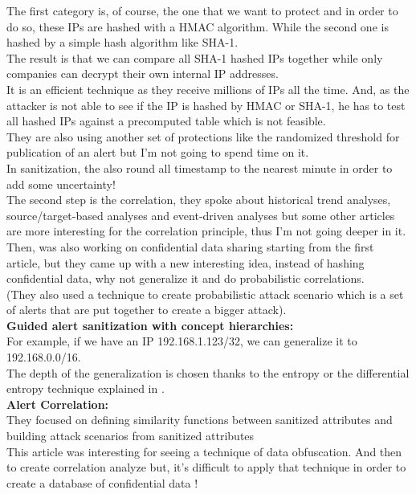 \documentclass[10pt]{article}
\begin{document}
The first category is, of course, the one that we want to protect and in order to do so, these IPs are hashed with a HMAC algorithm. While the second one is hashed by a simple hash algorithm like SHA-1.\\
The result is that we can compare all SHA-1 hashed IPs together while only companies can decrypt their own internal IP addresses.\\
It is an efficient technique as they receive millions of IPs all the time. And, as the attacker is not able to see if the IP is hashed by HMAC or SHA-1, he has to test all hashed IPs against a precomputed table which is not feasible.\\
They are also using another set of protections like the randomized threshold for publication of an alert but I'm not going to spend time on it.\\
In sanitization, the also round all timestamp to the nearest minute in order to add some uncertainty!\\
The second step is the correlation, they spoke about historical trend analyses, source/target-based analyses and event-driven analyses but some other articles are more interesting for the correlation principle, thus I'm not going deeper in it.\\

Then, \cite{xu2005privacy} was also working on confidential data sharing starting from the first article, but they came up with a new interesting idea, instead of hashing confidential data, why not generalize it and do probabilistic correlations.\\
(They also used a technique to create probabilistic attack scenario which is a set of alerts that are put together to create a bigger attack).\\
\textbf{Guided alert sanitization with concept hierarchies:}\\
For example, if we have an IP 192.168.1.123/32, we can generalize it to 192.168.0.0/16.\\
The depth of the generalization is chosen thanks to the entropy or the differential entropy technique explained in \cite{cover1991elements}.
\\
\textbf{Alert Correlation:}\\
They focused on defining similarity functions between sanitized attributes and building attack scenarios from sanitized attributes
\\

This article was interesting for seeing a technique of data obfuscation. And then to create correlation analyze but, it's difficult to apply that technique in order to create a database of confidential data !
\\
\end{document}
